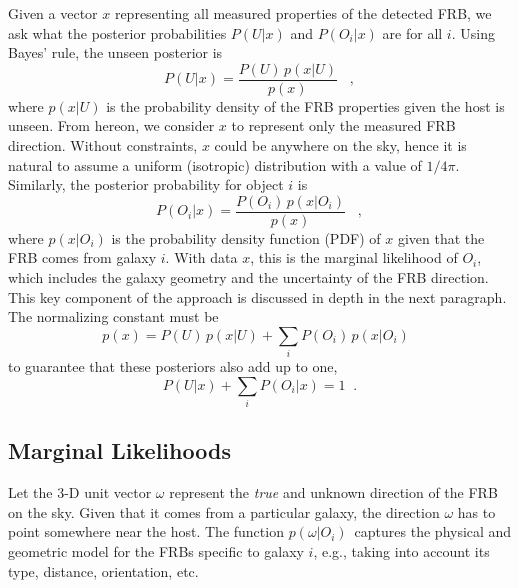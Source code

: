 \documentclass[twocolumn,linenumbers]{aastex63}
\newcommand{\smm}{\sum\limits}
\newcommand{\mpoffset}{p(\omega|O_i)}  %
\newcommand{\poffset}{$\mpoffset$}
\newcommand{\mPOi}{P(O_i)}  %
\newcommand{\mPU}{P(U)}  %
\newcommand{\mpxOi}{p(x|O_i)}  %
\newcommand{\mPOix}{P(O_i|x)}  %
\newcommand{\mPUx}{P(U|x)}  %
\begin{document}
Given a vector $x$ representing all measured properties of the detected FRB, we ask what the posterior probabilities $\mPUx$ and $\mPOix$ are for all $i$. 
Using Bayes' rule, the unseen posterior is
\begin{equation}
\mPUx = \frac{\mPU\,p(x|U)}{p(x)} \;\;\; ,
\label{eqn:U}
\end{equation}
where $p(x|U)$ is the probability density of the FRB properties given the host is unseen. From hereon, we consider $x$ to represent only the measured FRB direction.
Without constraints, $x$ could be anywhere on the sky, hence it is natural to assume a uniform (isotropic) distribution with a value of $1\big/4\pi$.
%
Similarly, the posterior probability for object $i$ is
\begin{equation}
\mPOix = \frac{\mPOi \, \mpxOi}{p(x)}  \;\;\; ,
\label{eqn:bayes}
\end{equation}
where $\mpxOi$ is the probability density function (PDF) of $x$ given that the FRB comes from galaxy $i$. 
With data $x$, this is the marginal likelihood of $O_i$, which includes the galaxy geometry and the uncertainty of the FRB direction. 
This key component of the approach is discussed in depth in the next paragraph.
%
The normalizing constant must be
\begin{equation}
    p(x) = \mPU\,p(x|U) + \smm_i \mPOi\,\mpxOi \;\; 
\label{eqn:denom}
\end{equation}
to guarantee that these posteriors also add up to one,
\begin{equation}
     \mPUx + \smm_i \mPOix  = 1 \;\; .
\label{eqn:posterior_norm}
\end{equation}


\subsection{Marginal Likelihoods}
\label{sec:marg_like}

Let the 3-D unit vector $\omega$ represent the 
{\it true} and unknown direction of the FRB on the sky.
Given that it comes from a particular galaxy, the direction $\omega$ has to point somewhere near the host.
The function \poffset\ captures the physical and geometric model for the FRBs specific to galaxy $i$, e.g., taking into account its type, distance, orientation, etc. 
\end{document}
